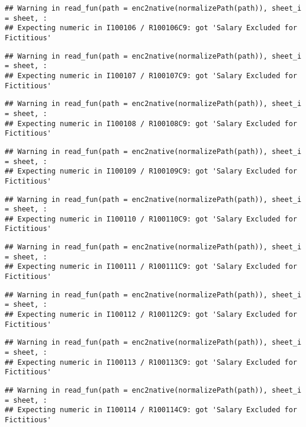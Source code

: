 \documentclass[
]{article}
\begin{document}
\begin{verbatim}
## Warning in read_fun(path = enc2native(normalizePath(path)), sheet_i = sheet, :
## Expecting numeric in I100106 / R100106C9: got 'Salary Excluded for Fictitious'
\end{verbatim}

\begin{verbatim}
## Warning in read_fun(path = enc2native(normalizePath(path)), sheet_i = sheet, :
## Expecting numeric in I100107 / R100107C9: got 'Salary Excluded for Fictitious'
\end{verbatim}

\begin{verbatim}
## Warning in read_fun(path = enc2native(normalizePath(path)), sheet_i = sheet, :
## Expecting numeric in I100108 / R100108C9: got 'Salary Excluded for Fictitious'
\end{verbatim}

\begin{verbatim}
## Warning in read_fun(path = enc2native(normalizePath(path)), sheet_i = sheet, :
## Expecting numeric in I100109 / R100109C9: got 'Salary Excluded for Fictitious'
\end{verbatim}

\begin{verbatim}
## Warning in read_fun(path = enc2native(normalizePath(path)), sheet_i = sheet, :
## Expecting numeric in I100110 / R100110C9: got 'Salary Excluded for Fictitious'
\end{verbatim}

\begin{verbatim}
## Warning in read_fun(path = enc2native(normalizePath(path)), sheet_i = sheet, :
## Expecting numeric in I100111 / R100111C9: got 'Salary Excluded for Fictitious'
\end{verbatim}

\begin{verbatim}
## Warning in read_fun(path = enc2native(normalizePath(path)), sheet_i = sheet, :
## Expecting numeric in I100112 / R100112C9: got 'Salary Excluded for Fictitious'
\end{verbatim}

\begin{verbatim}
## Warning in read_fun(path = enc2native(normalizePath(path)), sheet_i = sheet, :
## Expecting numeric in I100113 / R100113C9: got 'Salary Excluded for Fictitious'
\end{verbatim}

\begin{verbatim}
## Warning in read_fun(path = enc2native(normalizePath(path)), sheet_i = sheet, :
## Expecting numeric in I100114 / R100114C9: got 'Salary Excluded for Fictitious'
\end{verbatim}
\end{document}
